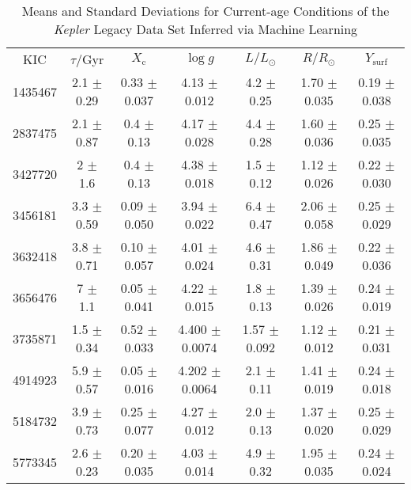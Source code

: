 \documentclass[epjCONF,columns]{svjour} %
\begin{document}
\begin{table*}
    \centering
    \caption{Means and Standard Deviations for Current-age Conditions of the \emph{Kepler} Legacy Data Set Inferred via Machine Learning}
    \label{tab:1}
    \fontsize{8}{9.5}\selectfont%
    \begin{tabular}{c|cccccc}
        \hline\noalign{\smallskip}
        KIC & $\tau/$Gyr & $X_{\mathrm{c}}$ & $\log g$ & $L/L_\odot$ & $R/R_\odot$ & $Y_{\mathrm{surf}}$ \\
        \noalign{\smallskip}\hline\noalign{\smallskip}
1435467  &        2.1    $\pm$  0.29   &      0.33   $\pm$  0.037  &      4.13   $\pm$  0.012  &      4.2    $\pm$  0.25   &      1.70   $\pm$  0.035  &      0.19   $\pm$  0.038    \\
2837475  &        2.1    $\pm$  0.87   &      0.4    $\pm$  0.13   &      4.17   $\pm$  0.028  &      4.4    $\pm$  0.28   &      1.60   $\pm$  0.036  &      0.25   $\pm$  0.035    \\
3427720  &        2      $\pm$  1.6    &      0.4    $\pm$  0.13   &      4.38   $\pm$  0.018  &      1.5    $\pm$  0.12   &      1.12   $\pm$  0.026  &      0.22   $\pm$  0.030    \\
3456181  &        3.3    $\pm$  0.59   &      0.09   $\pm$  0.050  &      3.94   $\pm$  0.022  &      6.4    $\pm$  0.47   &      2.06   $\pm$  0.058  &      0.25   $\pm$  0.029    \\
3632418  &        3.8    $\pm$  0.71   &      0.10   $\pm$  0.057  &      4.01   $\pm$  0.024  &      4.6    $\pm$  0.31   &      1.86   $\pm$  0.049  &      0.22   $\pm$  0.036    \\
3656476  &        7      $\pm$  1.1    &      0.05   $\pm$  0.041  &      4.22   $\pm$  0.015  &      1.8    $\pm$  0.13   &      1.39   $\pm$  0.026  &      0.24   $\pm$  0.019    \\
3735871  &        1.5    $\pm$  0.34   &      0.52   $\pm$  0.033  &      4.400  $\pm$  0.0074 &      1.57   $\pm$  0.092  &      1.12   $\pm$  0.012  &      0.21   $\pm$  0.031    \\
4914923  &        5.9    $\pm$  0.57   &      0.05   $\pm$  0.016  &      4.202  $\pm$  0.0064 &      2.1    $\pm$  0.11   &      1.41   $\pm$  0.019  &      0.24   $\pm$  0.018    \\
5184732  &        3.9    $\pm$  0.73   &      0.25   $\pm$  0.077  &      4.27   $\pm$  0.012  &      2.0    $\pm$  0.13   &      1.37   $\pm$  0.020  &      0.25   $\pm$  0.029    \\
5773345  &        2.6    $\pm$  0.23   &      0.20   $\pm$  0.035  &      4.03   $\pm$  0.014  &      4.9    $\pm$  0.32   &      1.95   $\pm$  0.035  &      0.24   $\pm$  0.024    \\

\end{tabular}
\end{table*}
\end{document}
